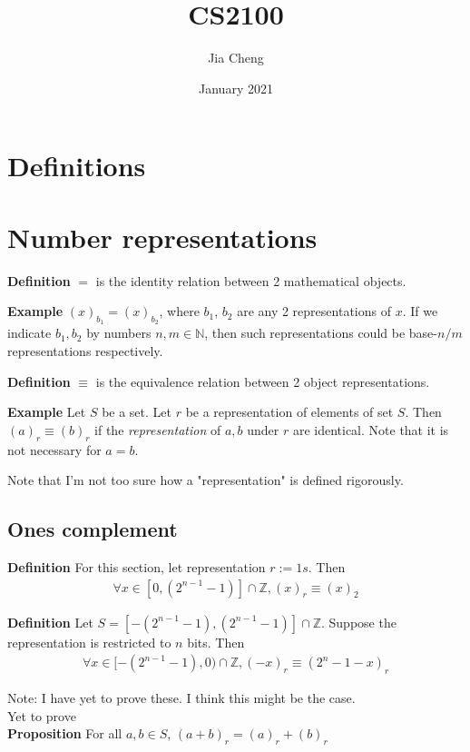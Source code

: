 \documentclass{article}
\title{CS2100}
\author{Jia Cheng}
\date{January 2021}
\begin{document}
\maketitle

\section{Definitions}


\section{Number representations}
\textbf{Definition} $=$ is the identity relation between 2 mathematical objects.

\textbf{Example} $(x)_{b_1}=(x)_{b_2}$, where $b_1$, $b_2$ are any 2 representations of $x$. If we indicate $b_1,b_2$ by numbers $n,m\in \mathbb{N}$, then such representations could be base-$n/m$ representations respectively.

\textbf{Definition} $\equiv$ is the equivalence relation between 2 object representations.

\textbf{Example} Let $S$ be a set. Let $r$ be a representation of elements of set $S$. Then $(a)_r\equiv (b)_r$ if the \textit{representation} of $a,b$ under $r$ are identical. Note that it is not necessary for $a=b$.

Note that I'm not too sure how a "representation" is defined rigorously.

\subsection{Ones complement}
\textbf{Definition} For this section, let representation $r:=1s$. Then \begin{align*}
	\forall x\in [0, (2^{n-1}-1)]\cap \mathbb{Z}, (x)_r\equiv(x)_2
\end{align*}

\textbf{Definition}  Let $S=[-(2^{n-1}-1), (2^{n-1}-1)]\cap \mathbb{Z}$. Suppose the representation is restricted to $n$ bits. Then \begin{align*}
	\forall x \in [-(2^{n-1}-1), 0)\cap \mathbb{Z}, (-x)_r \equiv (2^n-1-x)_r 
\end{align*}


Note: I have yet to prove these. I think this might be the case.\\

Yet to prove\\
\textbf{Proposition} For all $a,b\in S$, $(a+b)_r
=(a)_r+(b)_r$
\end{document}
